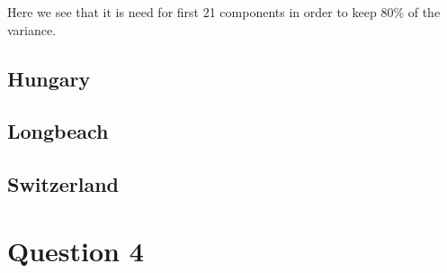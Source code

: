 \documentclass[a4paper]{article}
\begin{document}
Here we see that it is need for first 21 components in order to keep $80\%$ of the variance. 

\subsection{Hungary}

\subsection{Longbeach}

\subsection{Switzerland}

\section{Question 4}
\end{document}
